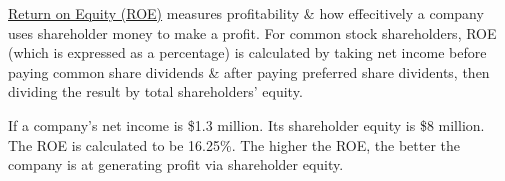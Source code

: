 \documentclass{article}
\begin{document}
	\href{https://www.investopedia.com/terms/r/returnonequity.asp}{Return on Equity (ROE)} measures profitability \& how effecitively a company uses shareholder money to make a profit. For common
	stock shareholders, ROE (which is expressed as a percentage) is calculated by taking net income before paying common share dividends \& after paying preferred share dividents, then dividing 
	the result by total shareholders' equity. \newline \newline

	If a company's net income is \$1.3 million. Its shareholder equity is \$8 million. The ROE is calculated to be 16.25\%. The higher the ROE, the better the company is at generating profit via
	shareholder equity.
\end{document}
